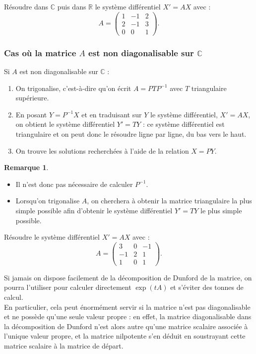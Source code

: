 \documentclass[french]{article}
\newcommand{\R}{\mathbb{R}}
\newcommand{\C}{\mathbb{C}}
\newcommand{\inv}{^{-1}}
\theoremstyle{plain}
\theoremstyle{definition}
\newtheorem*{rmq}{Remarque}
\theoremstyle{remark}
\begin{document}
\begin{exo}
	Résoudre dans $\C$ puis dans $\R$ le système différentiel $X'=AX$ avec :
	$$A=\begin{pmatrix}
		1&-1&2\\
		2&-1&3\\
		0&0&1
	\end{pmatrix}.$$
\end{exo}

\subsubsection*{Cas où la matrice $A$ est non diagonalisable sur $\C$}

\begin{met}
	Si $A$ est non diagonalisable sur $\C$ :
	\begin{enumerate}
		\item On trigonalise, c'est-à-dire qu'on écrit $A=PTP\inv$ avec $T$ triangulaire supérieure.
		\item En posant $Y=P\inv X$ et en traduisant sur $Y$ le système différentiel, $X'=AX$, on obtient le système différentiel $Y'=TY$ : ce système différentiel est triangulaire et on peut donc le résoudre ligne par ligne, du bas vers le haut.
		\item On trouve les solutions recherchées à l'aide de la relation $X=PY$.
	\end{enumerate}
\end{met}

\begin{rmq}
	\begin{itemize}
		\item Il n'est donc pas nécessaire de calculer $P\inv$.
		\item Lorsqu'on trigonalise $A$, on cherchera à obtenir la matrice triangulaire la plus simple possible afin d'obtenir le système différentiel $Y'=TY$ le plus simple possible.
	\end{itemize}
\end{rmq}

\begin{exo}
	Résoudre le système différentiel $X'=AX$ avec :
	$$A=\begin{pmatrix}
		3&0&-1\\
		-1&2&1\\
		1&0&1
	\end{pmatrix}.$$
\end{exo}

\begin{met}
	Si jamais on dispose facilement de la décomposition de Dunford de la matrice, on pourra l'utiliser pour calculer directement $\exp(tA)$ et s'éviter des tonnes de calcul.\\
	En particulier, cela peut énormément servir si la matrice n'est pas diagonalisable et ne possède qu'une seule valeur propre : en effet, la matrice diagonalisable dans la décomposition de Dunford n'est alors autre qu'une matrice scalaire associée à l'unique valeur propre, et la matrice nilpotente s'en déduit en soustrayant cette matrice scalaire à la matrice de départ.
\end{met}
\end{document}
